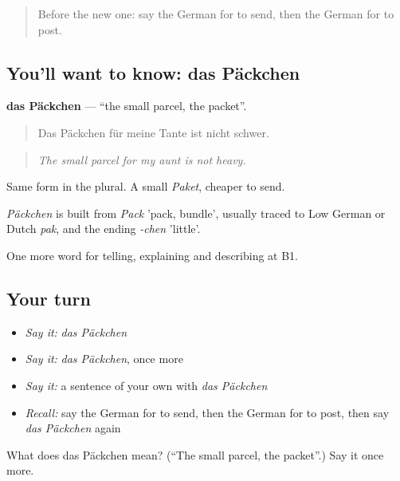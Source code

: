 \label{lesson:GE-C448-paeckchen}



\begin{quote}
Before the new one: say the German for to send, then the German for to post.
\end{quote}

\subsection*{You'll want to know: das Päckchen}
\textbf{das Päckchen} — \textquotedblleft{}the small parcel, the packet\textquotedblright{}.

\begin{quote}
Das Päckchen für meine Tante ist nicht schwer.
\end{quote}

\begin{quote}
\emph{The small parcel for my aunt is not heavy.}
\end{quote}

Same form in the plural. A small \emph{Paket}, cheaper to send.

\begin{cousinweb}
\emph{Päckchen} is built from \emph{Pack} 'pack, bundle', usually traced to Low German or Dutch \emph{pak}, and the ending \emph{-chen} 'little'.
\end{cousinweb}

\begin{grammarlens}[title={What you've built}]
One more word for telling, explaining and describing at B1.
\end{grammarlens}

\subsection*{Your turn}
\begin{itemize}
\raggedright
  \item \emph{Say it:} \emph{das Päckchen}
  \item \emph{Say it:} \emph{das Päckchen}, once more
  \item \emph{Say it:} a sentence of your own with \emph{das Päckchen}
  \item \emph{Recall:} say the German for to send, then the German for to post, then say \emph{das Päckchen} again
\end{itemize}

\begin{tcolorbox}[breakable,colback=teal!4,colframe=teal!35!black,title={Before you move on}]
What does das Päckchen mean? (\textquotedblleft{}The small parcel, the packet\textquotedblright{}.) Say it once more.
\end{tcolorbox}
